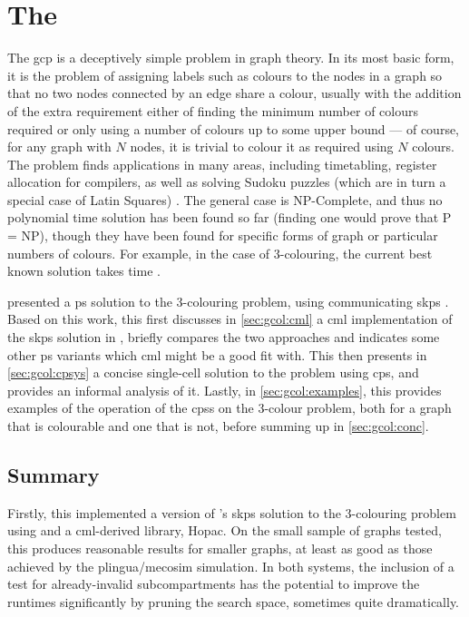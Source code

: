 \newcommand{\bo}{\(b\)}

\chapter{\label{chap:gcol}The }

The \gls{gcp} is a deceptively simple problem in graph theory.  In its most basic form, it is the problem of assigning labels such as colours to the nodes in a graph so that no two nodes connected by an edge share a colour, usually with the addition of the extra requirement either of finding the minimum number of colours required or only using a number of colours up to some upper bound --- of course, for any graph with \(N\) nodes, it is trivial to colour it as required using \(N\) colours.  The problem finds applications in many areas, including timetabling, register allocation for compilers, as well as solving Sudoku puzzles (which are in turn a special case of Latin Squares) \cite{Lewis2016}.  The general case is NP-Complete, and thus no polynomial time solution has been found so far (finding one would prove that P = NP), though they have been found for specific forms of graph or particular numbers of colours.  For example, in the case of 3-colouring, the current best known solution takes  time \cite{Beigel2005}.

\citeauthor{Gheorghe2013} presented a \gls{ps} solution to the 3-colouring problem, using communicating \gls{skps} \cite{Gheorghe2013}.  Based on this work, this  first discusses in \cref{sec:gcol:cml} a \gls{cml} implementation of the \gls{skps} solution in \cite{Gheorghe2013}, briefly compares the two approaches and indicates some other \gls{ps} variants which \gls{cml} might be a good fit with.  This  then presents in \cref{sec:gcol:cpsys} a concise single-cell solution to the problem using \gls{cps}, and provides an informal analysis of it.  Lastly, in \cref{sec:gcol:examples}, this  provides examples of the operation of the \glspl{cps} on the 3-colour problem, both for a graph that is colourable and one that is not, before summing up in \cref{sec:gcol:conc}.






\section{\label{sec:gcol:conc}Summary}
Firstly, this  implemented a version of \citeauthor{Gheorghe2013}'s \gls{skps} solution to the 3-colouring problem using \fsharp{} and a \gls{cml}-derived library, Hopac.   On the small sample of graphs tested, this produces reasonable results for smaller graphs, at least as good as those achieved by the \gls{plingua}/\gls{mecosim} simulation.  In both systems, the inclusion of a test for already-invalid sub\glspl{compartment} has the potential to improve the runtimes significantly by pruning the search space, sometimes quite dramatically.

